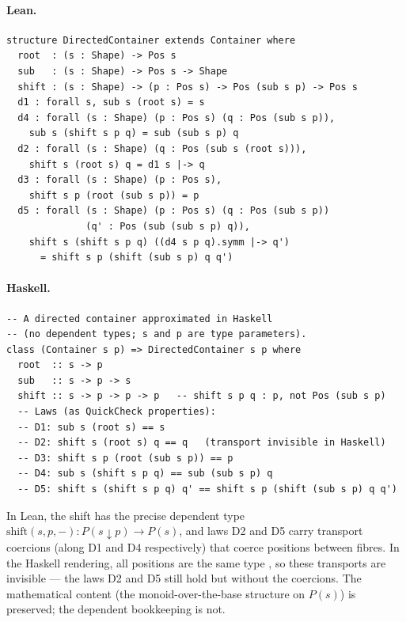 \documentclass[11pt,a4paper]{article}
\begin{document}
\paragraph{Lean.}
\begin{lstlisting}[style=lean]
structure DirectedContainer extends Container where
  root  : (s : Shape) -> Pos s
  sub   : (s : Shape) -> Pos s -> Shape
  shift : (s : Shape) -> (p : Pos s) -> Pos (sub s p) -> Pos s
  d1 : forall s, sub s (root s) = s
  d4 : forall (s : Shape) (p : Pos s) (q : Pos (sub s p)),
    sub s (shift s p q) = sub (sub s p) q
  d2 : forall (s : Shape) (q : Pos (sub s (root s))),
    shift s (root s) q = d1 s |-> q
  d3 : forall (s : Shape) (p : Pos s),
    shift s p (root (sub s p)) = p
  d5 : forall (s : Shape) (p : Pos s) (q : Pos (sub s p))
              (q' : Pos (sub (sub s p) q)),
    shift s (shift s p q) ((d4 s p q).symm |-> q')
      = shift s p (shift (sub s p) q q')
\end{lstlisting}

\paragraph{Haskell.}
\begin{lstlisting}[style=haskell]
-- A directed container approximated in Haskell
-- (no dependent types; s and p are type parameters).
class (Container s p) => DirectedContainer s p where
  root  :: s -> p
  sub   :: s -> p -> s
  shift :: s -> p -> p -> p   -- shift s p q : p, not Pos (sub s p)
  -- Laws (as QuickCheck properties):
  -- D1: sub s (root s) == s
  -- D2: shift s (root s) q == q   (transport invisible in Haskell)
  -- D3: shift s p (root (sub s p)) == p
  -- D4: sub s (shift s p q) == sub (sub s p) q
  -- D5: shift s (shift s p q) q' == shift s p (shift (sub s p) q q')
\end{lstlisting}

\begin{fidelitynote}
In Lean, the shift has the precise dependent type
$\mathrm{shift}(s, p, -)  : P(s \downarrow p) \to P(s)$, and laws D2 and D5
carry transport coercions (along D1 and D4 respectively) that coerce positions
between fibres.  In the Haskell rendering, all positions are the same type
, so these transports are invisible --- the laws D2 and D5 still hold
but without the coercions.  The mathematical content (the monoid-over-the-base
structure on $P(s)$) is preserved; the dependent bookkeeping is not.
\end{fidelitynote}
\end{document}
